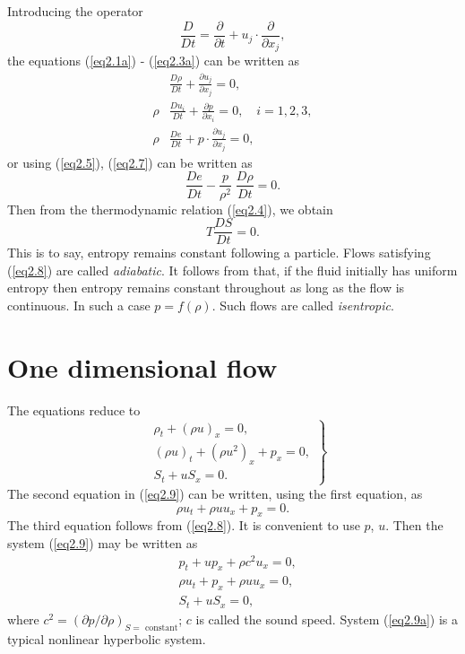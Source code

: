 Introducing the operator
$$
\frac{D}{Dt} = \frac{\partial}{\partial t} + u_j \cdot \frac{\partial}{\partial x_j}, 
$$
the equations (\ref{eq2.1a}) - (\ref{eq2.3a}) can be written as
\begin{align*}
& \frac{D\rho}{Dt} + \frac{\partial u_j}{\partial x_j} = 0, \tag{2.5}\label{eq2.5}\\
\rho & \frac{Du_i}{Dt} + \frac{\partial p}{\partial x_i} = 0, \quad i = 1,2,3, \tag{2.6}\label{eq2.6}\\
\rho & \frac{De}{Dt} + p \cdot \frac{\partial u_j}{\partial x_j} = 0, \tag{2.7}\label{eq2.7}
\end{align*}
or using (\ref{eq2.5}), (\ref{eq2.7}) can be written as 
$$
\frac{De}{Dt} - \frac{p}{\rho^2} \; \frac{D\rho}{Dt} = 0.
$$
Then from the thermodynamic relation (\ref{eq2.4}), we obtain
\begin{equation*}
T \frac{DS}{Dt} = 0. \tag{2.8}\label{eq2.8}
\end{equation*}
This is to say, entropy remains constant following a particle. Flows satisfying (\ref{eq2.8}) are called {\em adiabatic}. It follows from that, if the fluid initially has uniform entropy then entropy remains constant throughout as long as the flow is continuous. In such  a case $p = f(\rho)$. Such flows are called {\em isentropic}. 

\section{One dimensional flow}\label{chap2:sec2.3}

The equations reduce to 
\begin{equation*}
\left. 
\begin{aligned}
& \rho_t + (\rho u)_x = 0,\\
& (\rho u )_t + (\rho u^2)_x + p_x = 0, \\
& S_t + uS_x = 0. 
\end{aligned}
\right\} \tag{2.9}\label{eq2.9}
\end{equation*}\pageoriginale
The second equation in (\ref{eq2.9}) can be written, using the first equation, as 
$$
\rho u_t + \rho u u_x + p_x = 0.
$$
The third equation follows from (\ref{eq2.8}). It is convenient to use $p$, $u$. Then the system (\ref{eq2.9}) may be written as
\begin{align*}
& p_t + up_x + \rho c^2 u_x = 0, \\
& \rho u_t + p_x + \rho u u_x = 0, \tag{2.9(a)}\label{eq2.9a}\\
& S_t + uS_x = 0, 
\end{align*}
where $c^2 = (\partial p / \partial \rho)_{S =  \text{ constant}}$; $c$ is called the sound speed. System (\ref{eq2.9a}) is a typical nonlinear hyperbolic system.


